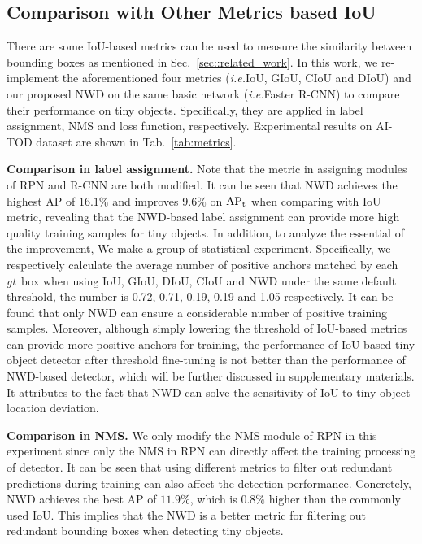 \documentclass{article}
\newcommand{\ie}{\textit{i.e.}}
\newcommand{\gt}{\textit{gt}~}
\begin{document}
\subsection{Comparison with Other Metrics based IoU}

There are some IoU-based metrics can be used to measure the similarity between bounding boxes as mentioned in Sec.~\ref{sec::related_work}. In this work, we re-implement the aforementioned four metrics (\ie IoU, GIoU, CIoU and DIoU) and our proposed NWD on the same basic network (\ie Faster R-CNN) to compare their performance on tiny objects. Specifically, they are applied in label assignment, NMS and loss function, respectively. Experimental results on AI-TOD dataset are shown in Tab.~\ref{tab:metrics}.

\textbf{Comparison in label assignment.} Note that the metric in assigning modules of RPN and R-CNN are both modified. It can be seen that NWD achieves the highest AP of $16.1\%$ and improves $9.6\%$ on $\rm{AP_{t}}$ when comparing with IoU metric, revealing that the NWD-based label assignment can provide more high quality training samples for tiny objects. In addition, to analyze the essential of the improvement, We make a group of statistical experiment. Specifically, we respectively calculate the average number of positive anchors matched by each \gt box when using IoU, GIoU, DIoU, CIoU and NWD under the same default threshold, the number is 0.72, 0.71, 0.19, 0.19 and 1.05 respectively. It can be found that only NWD can ensure a considerable number of positive training samples. Moreover, although simply lowering the threshold of IoU-based metrics can provide more positive anchors for training, the performance of IoU-based tiny object detector after threshold fine-tuning is not better than the performance of NWD-based detector, which will be further discussed in supplementary materials. It attributes to the fact that NWD can solve the sensitivity of IoU to tiny object location deviation.

\textbf{Comparison in NMS.} We only modify the NMS module of RPN in this experiment since only the NMS in RPN can directly affect the training processing of detector. It can be seen that using different metrics to filter out redundant predictions during training can also affect the detection performance. Concretely, NWD achieves the best AP of $11.9\%$, which is $0.8\%$ higher than the commonly used IoU. This implies that the NWD is a better metric for filtering out redundant bounding boxes when detecting tiny objects.
\end{document}
